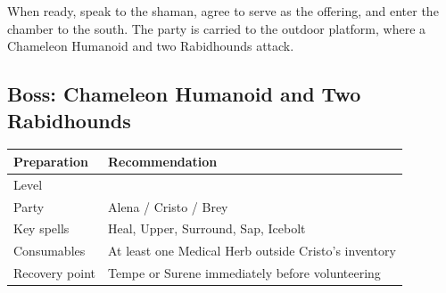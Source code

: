 \documentclass[
  american,
  10pt,
  letterpaper,
  oneside,
  open=any]{scrreprt}
\newcounter{none} %
\newenvironment{guidetable}{%
  \small\setstretch{1.0}%
  \setlength{\tabcolsep}{4pt}%
  \setlength{\LTpre}{8pt}\setlength{\LTpost}{10pt}%
  \renewcommand{\arraystretch}{1.16}%
}{ }
\begin{document}
When ready, speak to the shaman, agree to serve as the offering, and
enter the chamber to the south. The party is carried to the outdoor
platform, where a Chameleon Humanoid and two Rabidhounds attack.

\subsection{Boss: Chameleon Humanoid and Two
Rabidhounds}\label{boss-chameleon-humanoid-and-two-rabidhounds}

\begin{guidetable}

{\def\LTcaptype{none} %
\begin{longtable}[]{@{}
  >{\raggedright\arraybackslash}p{}
  >{\raggedright\arraybackslash}p{}@{}}
\toprule\noalign{}
\begin{minipage}[b]{\linewidth}\raggedright
\color{GuideGreen}\bfseries Preparation
\end{minipage} & \begin{minipage}[b]{\linewidth}\raggedright
\color{GuideGreen}\bfseries Recommendation
\end{minipage} \\
\midrule\noalign{}
\endhead
\bottomrule\noalign{}
\endlastfoot
Level & 6 \\
Party & Alena / Cristo / Brey \\
Key spells & Heal, Upper, Surround, Sap, Icebolt \\
Consumables & At least one Medical Herb outside Cristo's inventory \\
Recovery point & Tempe or Surene immediately before volunteering \\
\end{longtable}
}

\end{guidetable}
\end{document}

